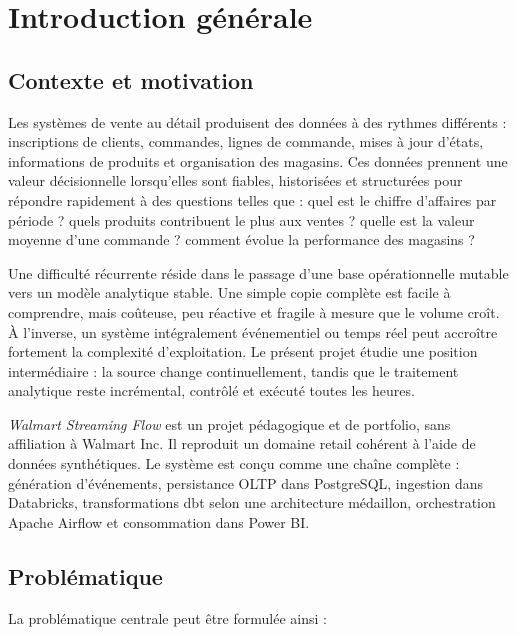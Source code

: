 \chapter*{Introduction générale}

\section*{Contexte et motivation}
Les systèmes de vente au détail produisent des données à des rythmes différents : inscriptions de clients, commandes, lignes de commande, mises à jour d'états, informations de produits et organisation des magasins. Ces données prennent une valeur décisionnelle lorsqu'elles sont fiables, historisées et structurées pour répondre rapidement à des questions telles que : quel est le chiffre d'affaires par période ? quels produits contribuent le plus aux ventes ? quelle est la valeur moyenne d'une commande ? comment évolue la performance des magasins ?

Une difficulté récurrente réside dans le passage d'une base opérationnelle mutable vers un modèle analytique stable. Une simple copie complète est facile à comprendre, mais coûteuse, peu réactive et fragile à mesure que le volume croît. À l'inverse, un système intégralement événementiel ou temps réel peut accroître fortement la complexité d'exploitation. Le présent projet étudie une position intermédiaire : la source change continuellement, tandis que le traitement analytique reste incrémental, contrôlé et exécuté toutes les heures.

\emph{Walmart Streaming Flow} est un projet pédagogique et de portfolio, sans affiliation à Walmart Inc. Il reproduit un domaine retail cohérent à l'aide de données synthétiques. Le système est conçu comme une chaîne complète : génération d'événements, persistance OLTP dans PostgreSQL, ingestion dans Databricks, transformations dbt selon une architecture médaillon, orchestration Apache Airflow et consommation dans Power BI.

\section*{Problématique}
La problématique centrale peut être formulée ainsi :



